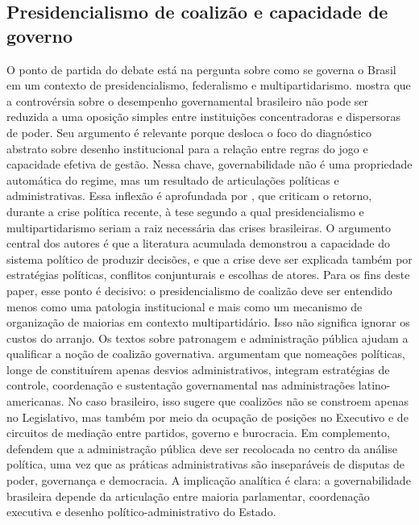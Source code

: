 \documentclass[12pt,a4paper]{article}
\begin{document}
\subsection{Presidencialismo de coalizão e capacidade de governo}
\label{sec:org36f7d74}
O ponto de partida do debate está na pergunta sobre como se governa o Brasil em um contexto de presidencialismo, federalismo e multipartidarismo. \textcite{palermo2000_como_se} mostra que a controvérsia sobre o desempenho governamental brasileiro não pode ser reduzida a uma oposição simples entre instituições concentradoras e dispersoras de poder. Seu argumento é relevante porque desloca o foco do diagnóstico abstrato sobre desenho institucional para a relação entre regras do jogo e capacidade efetiva de gestão. Nessa chave, governabilidade não é uma propriedade automática do regime, mas um resultado de articulações políticas e administrativas.
Essa inflexão é aprofundada por \textcite{limongi2017_a_crise}, que criticam o retorno, durante a crise política recente, à tese segundo a qual presidencialismo e multipartidarismo seriam a raiz necessária das crises brasileiras. O argumento central dos autores é que a literatura acumulada demonstrou a capacidade do sistema político de produzir decisões, e que a crise deve ser explicada também por estratégias políticas, conflitos conjunturais e escolhas de atores. Para os fins deste paper, esse ponto é decisivo: o presidencialismo de coalizão deve ser entendido menos como uma patologia institucional e mais como um mecanismo de organização de maiorias em contexto multipartidário.
Isso não significa ignorar os custos do arranjo. Os textos sobre patronagem e administração pública ajudam a qualificar a noção de coalizão governativa. \textcite{panizza2022_the_politics} argumentam que nomeações políticas, longe de constituírem apenas desvios administrativos, integram estratégias de controle, coordenação e sustentação governamental nas administrações latino-americanas. No caso brasileiro, isso sugere que coalizões não se constroem apenas no Legislativo, mas também por meio da ocupação de posições no Executivo e de circuitos de mediação entre partidos, governo e burocracia. Em complemento, \textcite{guy2022_bringing_political} defendem que a administração pública deve ser recolocada no centro da análise política, uma vez que as práticas administrativas são inseparáveis de disputas de poder, governança e democracia. A implicação analítica é clara: a governabilidade brasileira depende da articulação entre maioria parlamentar, coordenação executiva e desenho político-administrativo do Estado.
\end{document}
